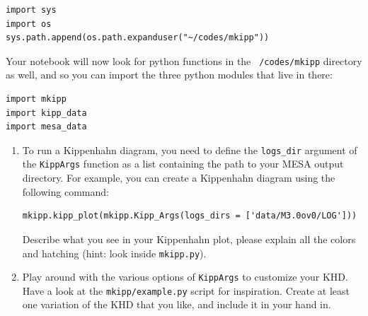 \documentclass[11pt,a4paper]{article}
\begin{document}
\begin{itemize}
\begin{lstlisting}[style=pythonstyle]
import sys
import os
sys.path.append(os.path.expanduser("~/codes/mkipp"))
\end{lstlisting}

  Your notebook will now look for python functions in the \texttt{~/codes/mkipp} directory as well, and so you can import the three python modules that live in there:

\begin{lstlisting}[style=pythonstyle]
import mkipp
import kipp_data
import mesa_data
\end{lstlisting}

\end{itemize}

\begin{enumerate}[label=\alph*)]
\item To run a Kippenhahn diagram, you need to define the \texttt{logs\_dir} argument of the \texttt{KippArgs} function as a list containing the path to your MESA output directory. For example, you can create a Kippenhahn diagram using the following command:

\begin{lstlisting}[style=pythonstyle]
mkipp.kipp_plot(mkipp.Kipp_Args(logs_dirs = ['data/M3.0ov0/LOG']))
\end{lstlisting}

Describe what you see in your Kippenhahn plot, please explain all the colors and hatching (hint: look inside \texttt{mkipp.py}).

\item Play around with the various options of \texttt{KippArgs} to customize your KHD. Have a look at the \texttt{mkipp/example.py} script for inspiration. 
Create at least one variation of the KHD that you like, and include it in your hand in.


\end{enumerate}


% 
% 
\end{document}
